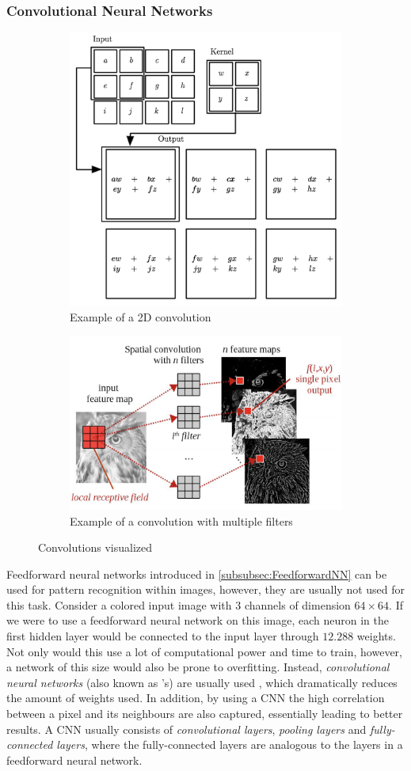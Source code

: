 \documentclass[./main.tex]{subfiles}
\begin{document}
\subsubsection{Convolutional Neural Networks} \label{subsubsec:CNN}
\begin{figure}[htbp]
    \centering
    \begin{subfigure}[t]{0.4\textwidth}
        \centering
        \includegraphics[height = 6 cm]{entities/2d_convolution_example.png}
        \caption{Example of a 2D convolution \cite{DeepLearning}}
    \end{subfigure}
    \begin{subfigure}[t]{0.4\textwidth}
        \centering
        \includegraphics[height = 5 cm]{entities/3d_convolution_example.png}
        \caption{Example of a convolution with multiple filters \cite{Everything}}
    \end{subfigure}
    \caption{Convolutions visualized}
    \label{fig:convolutionexample}
\end{figure}
\noindent Feedforward neural networks introduced in \ref{subsubsec:FeedforwardNN} can be used for pattern recognition within images, however, they are usually not used for this task. Consider a colored input image with $3$ channels of dimension $64 \times 64$. If we were to use a feedforward neural network on this image, each neuron in the first hidden layer would be connected to the input layer through $12.288$ weights. Not only would this use a lot of computational power and time to train, however, a network of this size would also be prone to overfitting. Instead, \textit{convolutional neural networks} (also known as 's) are usually used \cite{CNN}, which dramatically reduces the amount of weights used. In addition, by using a CNN the high correlation between a pixel and its neighbours are also captured, essentially leading to better results. A CNN usually consists of \textit{convolutional layers}, \textit{pooling layers} and \textit{fully-connected layers}, where the fully-connected layers are analogous to the layers in a feedforward neural network.
\end{document}

